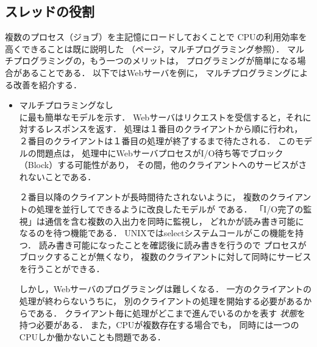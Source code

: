 \subsection{スレッドの役割}
複数のプロセス（ジョブ）を主記憶にロードしておくことで
CPUの利用効率を高くできることは既に説明した
（\pageref{multiprogramming}ページ，マルチプログラミング参照）．
マルチプログラミングの，もう一つのメリットは，
プログラミングが簡単になる場合があることである．
以下ではWebサーバを例に，
マルチプログラミングによる改善を紹介する．

\begin{itemize}
\item マルチプロラミングなし \\
  に最も簡単なモデルを示す．
  Webサーバはリクエストを受信すると，それに対するレスポンスを返す．
  処理は１番目のクライアントから順に行われ，
  ２番目のクライアントは１番目の処理が終了するまで待たされる．
  このモデルの問題点は，
  処理中にWebサーバプロセスがI/O待ち等でブロック（Block）する可能性があり，
  その間，他のクライアントへのサービスがされないことである．

  ２番目以降のクライアントが長時間待たされないように，
  複数のクライアントの処理を並行してできるように改良したモデルが
  である．
  「I/O完了の監視」は通信を含む複数の入出力を同時に監視し，
  どれかが読み書き可能になるのを待つ機能である．
  UNIXではselectシステムコールがこの機能を持つ．
  読み書き可能になったことを確認後に読み書きを行うので
  プロセスがブロックすることが無くなり，
  複数のクライアントに対して同時にサービスを行うことができる．

  しかし，Webサーバのプログラミングは難しくなる．
  一方のクライアントの処理が終わらないうちに，
  別のクライアントの処理を開始する必要があるからである．
  クライアント毎に処理がどこまで進んでいるのかを表す
  \emph{状態}を持つ必要がある．
  また，CPUが複数存在する場合でも，
  同時には一つのCPUしか働かないことも問題である．


\end{itemize}
